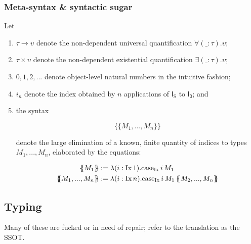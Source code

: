 \documentclass[authoryear,acmsmall,screen]{acmart}
\newcommand\Todo[1]{{\color{red} #1}}
\newcommand\IX{\textsc{Ix}}
\newcommand\FZero{\mathsf{I_0}}
\newcommand\Suc{\mathrm{S}}
\newcommand\FSuc{\mathsf{I_{\Suc}}}
\newcommand\Ix[1]{\mathrm{Ix} \, #1}
\renewcommand\Case{\mathrm{case}}
\newcommand\CaseFZ[2]{\ensuremath{\Case_{\mathrm{\IX{}}} \, #1 \, #2 }}
\newcommand\CaseFS[3]{\ensuremath{\Case_{\mathrm{\IX{}}} \, #1 \, #2 \, #3 }}
\newcommand\Felim[1]{\{\!\!\{#1\}\!\!\}}
\begin{document}
\subsubsection{Meta-syntax \& syntactic sugar}

Let
\begin{enumerate}
\item $\tau \to \upsilon$ denote the non-dependent universal quantification $\forall (\_ : \tau). \upsilon$;
\item $\tau \times \upsilon$ denote the non-dependent existential quantification $\exists (\_ : \tau). \upsilon$;
\item $0,1,2,...$ denote object-level natural numbers in the intuitive fashion; \item $i_{n}$ denote the index obtained by $n$ applications of $\FSuc$ to $\FZero$; and
\item the syntax 

\[
\Felim {M_1,...,M_n}
\]

denote the large elimination of a known, finite quantity of indices to types $M_{1},...,M_{n}$, elaborated by the equations:

\begin{align*}
  \Felim{M_{1}} &:= \lambda (i : \Ix{1}). \CaseFZ i M_{1} \\
  \Felim{M_{1},...,M_{n}} &:= \lambda (i : \Ix{n}). \CaseFS i {M_{1}} \Felim{M_{2},...,M_{n}}
\end{align*}


\end{enumerate}

\subsection{Typing}

\Todo{Many of these are fucked or in need of repair; refer to the translation as the SSOT.}
\end{document}
